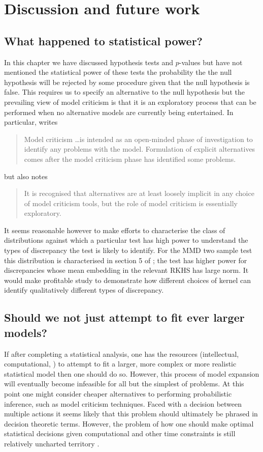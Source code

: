 \section{Discussion and future work}

\subsection{What happened to statistical power?}

In this chapter we have discussed hypothesis tests and $p$-values but have not mentioned the statistical power of these tests \ie the probability the the null hypothesis will be rejected by some procedure given that the null hypothesis is false.
This requires us to specify an alternative to the null hypothesis but the prevailing view of model criticism is that it is an exploratory process that can be performed when no alternative models are currently being entertained.
In particular, \citet{OHagan2003-bc} writes
\begin{quotation}
Model criticism \dots is intended as an open-minded phase of investigation
to identify any problems with the model. Formulation of explicit alternatives
comes after the model criticism phase has identified some problems.
\end{quotation}
but also notes
\begin{quotation}
It is recognised that alternatives are at least loosely implicit
in any choice of model criticism tools, but the role of model criticism is
essentially exploratory.
\end{quotation}
It seems reasonable however to make efforts to characterise the class of distributions against which a particular test has high power to understand the types of discrepancy the test is likely to identify.
For the MMD two sample test this distribution is characterised in section 5 of \cite{Gretton2012-ss}; the test has higher power for discrepancies whose mean embedding in the relevant RKHS has large norm.
It would make profitable study to demonstrate how different choices of kernel can identify qualitatively different types of discrepancy.

\subsection{Should we not just attempt to fit ever larger models?}

If after completing a statistical analysis, one has the resources (intellectual, computational, \etc) to attempt to fit a larger, more complex or more realistic statistical model then one should do so.
However, this process of model expansion will eventually become infeasible for all but the simplest of problems.
At this point one might consider cheaper alternatives to performing probabilistic inference, such as model criticism techniques.
Faced with a decision between multiple actions it seems likely that this problem should ultimately be phrased in decision theoretic terms.
However, the problem of how one should make optimal statistical decisions given computational and other time constraints is still relatively uncharted territory \citep{Jordan2013-uv}.

